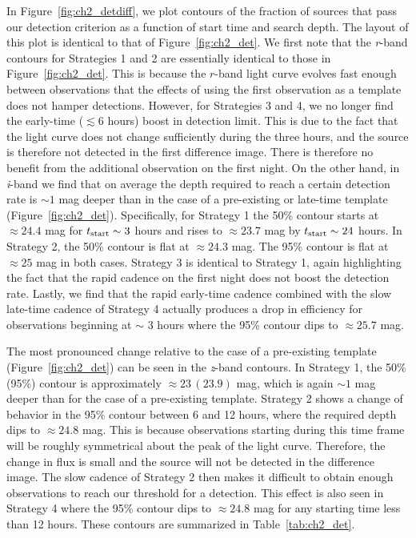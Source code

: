 In Figure~\ref{fig:ch2_detdiff}, we plot contours of the fraction of sources that pass our detection criterion as a function of start time and search depth. The layout of this plot is identical to that of Figure~\ref{fig:ch2_det}. We first note that the {\em r}-band contours for Strategies 1 and 2 are essentially identical to those in Figure~\ref{fig:ch2_det}. This is because the $r$-band light curve evolves fast enough between observations that the effects of using the first observation as a template does not hamper detections. However, for Strategies 3 and 4, we no longer find the early-time ($\lesssim6$ hours) boost in detection limit. This is due to the fact that the light curve does not change sufficiently during the three hours, and the source is therefore not detected in the first difference image. There is therefore no benefit from the additional observation on the first night. On the other hand, in {\em i}-band we find that on average the depth required to reach a certain detection rate is $\sim 1$ mag deeper than in the case of a pre-existing or late-time template (Figure~\ref{fig:ch2_det}). Specifically, for Strategy 1 the 50\% contour starts at $\approx24.4$ mag for $t_{{\rm start}} \sim 3$ hours and rises to $\approx 23.7$ mag by $t_{{\rm start}} \sim24$ hours. In Strategy 2, the 50\% contour is flat at $\approx24.3$ mag. The 95\% contour is flat at $\approx25$ mag in both cases. Strategy 3 is identical to Strategy 1, again highlighting the fact that the rapid cadence on the first night does not boost the detection rate. Lastly, we find that the rapid early-time cadence combined with the slow late-time cadence of Strategy 4 actually produces a drop in efficiency for observations beginning at $\sim$ 3 hours where the 95\% contour dips to $\approx 25.7$ mag.

The most pronounced change relative to the case of a pre-existing template (Figure~\ref{fig:ch2_det}) can be seen in the {\em z}-band contours. In Strategy 1, the 50\% (95\%) contour is approximately $\approx 23\,(23.9)$ mag, which is again $\sim 1$ mag deeper than for the case of a pre-existing template. Strategy 2 shows a change of behavior in the 95\% contour between 6 and 12 hours, where the required depth dips to $\approx 24.8$ mag. This is because observations starting during this time frame will be roughly symmetrical about the peak of the light curve. Therefore, the change in flux is small and the source will not be detected in the difference image. The slow cadence of Strategy 2 then makes it difficult to obtain enough observations to reach our threshold for a detection. This effect is also seen in Strategy 4 where the 95\% contour dips to $\approx 24.8$ mag for any starting time less than 12 hours. These contours are summarized in Table~\ref{tab:ch2_det}.

